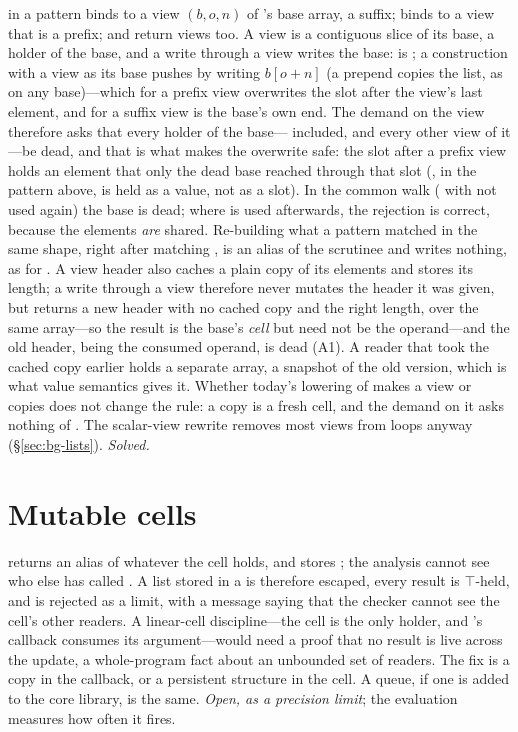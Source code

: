 \code{[ x, …rest ]} in a pattern binds  to a view $(b, o, n)$ of 's base array, a
suffix;  binds  to a view that is a prefix;  and
 return views too. A view is a contiguous slice of its base, a holder of the base, and a
write through a view writes the base:  is ; a construction with
a view as its base pushes by writing $b[o + n]$ (a prepend copies the list, as on any base)---which for a
prefix view overwrites the slot after the view's last element, and for a suffix view is the base's own
end. The demand on the view therefore asks that every holder of the base--- included, and every
other view of it---be dead, and that is what makes the overwrite safe: the slot after a prefix view holds
an element that only the dead base reached through that slot (, in the pattern above, is held
as a value, not as a slot). In the common walk ( with  not used again) the base is
dead; where  is used afterwards, the rejection is correct, because the elements \emph{are}
shared. Re-building what a pattern matched in the same shape,  right after matching
, is an alias of the scrutinee and writes nothing, as for \code{[ h, …t ]}. A view
header also caches a plain copy of its elements and stores its length; a write through a view therefore
never mutates the header it was given, but returns a new header with no cached copy and the right length,
over the same array---so the result is the base's \emph{cell} but need not be \code{===} the operand---and
the old header, being the consumed operand, is dead (A1). A reader that took the cached copy earlier holds
a separate array, a snapshot of the old version, which is what value semantics gives it. Whether today's
lowering of  makes a view or copies  does not change the rule: a copy is a
fresh cell, and the demand on it asks nothing of . The scalar-view rewrite removes most views from
loops anyway (\S\ref{sec:bg-lists}). \emph{Solved.}

\section{Mutable cells}
\label{sec:hard-ref}

 returns an alias of whatever the cell holds, and  stores ;
the analysis cannot see who else has called . A list stored in a  is therefore
escaped, every  result is $\top$-held, and  is
rejected as a limit, with a message saying that the checker cannot see the cell's other readers. A
linear-cell discipline---the cell is the only holder, and 's callback consumes its
argument---would need a proof that no  result is live across the update, a
whole-program fact about an unbounded set of readers. The fix is a copy in the callback, or a
persistent structure in the cell. A queue, if one is added to the core library, is the same.
\emph{Open, as a precision limit}; the evaluation measures how often it fires.

